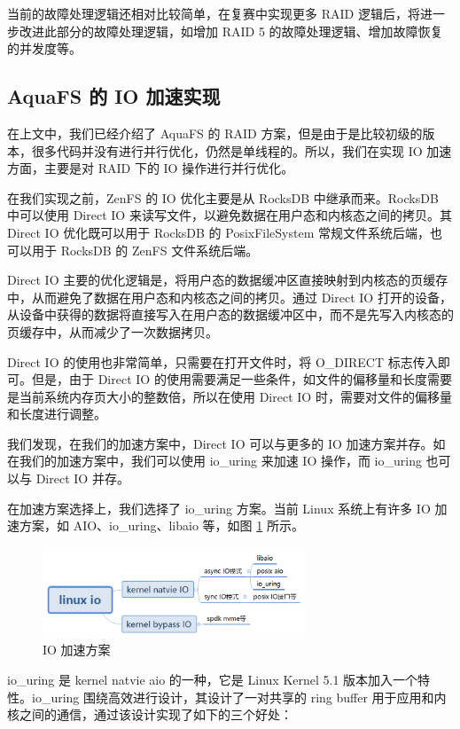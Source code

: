 当前的故障处理逻辑还相对比较简单，在复赛中实现更多 RAID 逻辑后，将进一步改进此部分的故障处理逻辑，如增加 RAID 5 的故障处理逻辑、增加故障恢复的并发度等。

\subsection{AquaFS 的 IO 加速实现}

在上文中，我们已经介绍了 AquaFS 的 RAID 方案，但是由于是比较初级的版本，很多代码并没有进行并行优化，仍然是单线程的。所以，我们在实现 IO 加速方面，主要是对 RAID 下的 IO 操作进行并行优化。

在我们实现之前，ZenFS 的 IO 优化主要是从 RocksDB 中继承而来。RocksDB 中可以使用 Direct IO 来读写文件，以避免数据在用户态和内核态之间的拷贝。其 Direct IO 优化既可以用于 RocksDB 的 PosixFileSystem 常规文件系统后端，也可以用于 RocksDB 的 ZenFS 文件系统后端。

Direct IO 主要的优化逻辑是，将用户态的数据缓冲区直接映射到内核态的页缓存中，从而避免了数据在用户态和内核态之间的拷贝。通过 Direct IO 打开的设备，从设备中获得的数据将直接写入在用户态的数据缓冲区中，而不是先写入内核态的页缓存中，从而减少了一次数据拷贝。

Direct IO 的使用也非常简单，只需要在打开文件时，将 O\_DIRECT 标志传入即可。但是，由于 Direct IO 的使用需要满足一些条件，如文件的偏移量和长度需要是当前系统内存页大小的整数倍，所以在使用 Direct IO 时，需要对文件的偏移量和长度进行调整。

我们发现，在我们的加速方案中，Direct IO 可以与更多的 IO 加速方案并存。如在我们的加速方案中，我们可以使用 io\_uring 来加速 IO 操作，而 io\_uring 也可以与 Direct IO 并存。

在加速方案选择上，我们选择了 io\_uring 方案。当前 Linux 系统上有许多 IO 加速方案，如 AIO、io\_uring、libaio 等，如图 \ref{io-speedup} 所示。

\begin{figure}[htbp]
  \centering
  \includegraphics[width=0.7\textwidth]{fig/io-speedup.png}
  \caption{IO 加速方案}
  \label{io-speedup}
\end{figure}

io\_uring 是 kernel natvie aio 的一种，它是 Linux Kernel 5.1 版本加入一个特性。io\_uring 围绕高效进行设计，其设计了一对共享的 ring buffer 用于应用和内核之间的通信，通过该设计实现了如下的三个好处：


